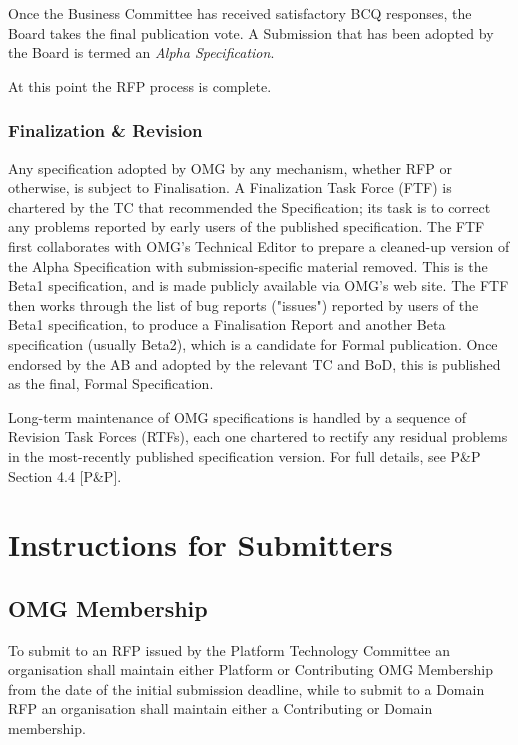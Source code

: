 Once the Business Committee has received satisfactory BCQ responses, the Board takes the final publication vote. A Submission that has been adopted by the Board is termed an \textit{Alpha Specification}.

At this point the RFP process is complete.


\subsubsection{Finalization \& Revision}

Any specification adopted by OMG by any mechanism, whether RFP or otherwise, is subject to Finalisation. A Finalization Task Force (FTF) is chartered by the TC that recommended the Specification; its task is to correct any problems reported by early users of the published specification. The FTF first collaborates with OMG's Technical Editor to prepare a cleaned-up version of the Alpha Specification with submission-specific material removed. This is the Beta1 specification, and is made publicly available via OMG's web site. The FTF then works through the list of bug reports ("issues") reported by users of the Beta1 specification, to produce a Finalisation Report and another Beta specification (usually Beta2), which is a candidate for Formal publication. Once endorsed by the AB and adopted by the relevant TC and BoD, this is published as the final, Formal Specification.

Long-term maintenance of OMG specifications is handled by a sequence of Revision Task Forces (RTFs), each one chartered to rectify any residual problems in the most-recently published specification version. For full details, see P\&P Section 4.4 [P\&P].


\section{Instructions for Submitters}
\subsection{OMG Membership}

To submit to an RFP issued by the Platform Technology Committee an organisation shall maintain either Platform or Contributing OMG Membership from the date of the initial submission deadline, while to submit to a Domain RFP an organisation shall maintain either a Contributing or Domain membership.

